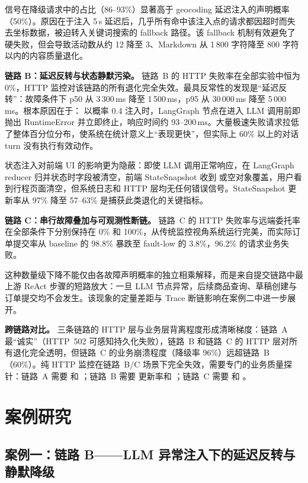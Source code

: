  信号在降级请求中的占比（86--93\%）显著高于 geocoding 延迟注入的声明概率（50\%）。原因在于注入 5\,s 延迟后，几乎所有命中该注入点的请求都因超时而失去坐标数据，被迫转入关键词搜索的 fallback 路径。该 fallback 机制有效避免了硬失败，但会导致活动数从约 12 降至 3、Markdown 从 1\,800 字符降至 800 字符以内的内容质量退化。

\noindent\textbf{链路 B：延迟反转与状态静默污染。}
链路~B 的 HTTP 失败率在全部实验中恒为 0\%，HTTP 监控对该链路的所有退化完全失效。最具反常性的发现是“延迟反转”：故障条件下 p50 从 3\,300\,ms 降至 1\,500\,ms，p95 从 30\,000\,ms 降至 5\,000\,ms。根本原因在于： 以概率 0.4 注入时，LangGraph 节点在进入 LLM 调用前即抛出 RuntimeError 并立即终止，响应时间约 93--200\,ms。大量极速失败请求拉低了整体百分位分布，使系统在统计意义上“表现更快”，但实际上 60\% 以上的对话 turn 没有执行有效动作。

状态注入对前端 UI 的影响更为隐蔽：即使 LLM 调用正常响应，在 LangGraph reducer 归并状态时字段被清空，前端 StateSnapshot 收到  或空对象覆盖，用户看到行程页面清空，但系统日志和 HTTP 层均无任何错误信号。StateSnapshot 更新率从 97\% 降至 57--63\% 是捕获此类退化的关键指标。

\noindent\textbf{链路 C：串行故障叠加与可观测性断链。}
链路~C 的 HTTP 失败率与远端委托率在全部条件下分别保持在 0\% 和 100\%，从传统监控视角系统运行完美，而实际订单提交率从 baseline 的 98.8\% 暴跌至 fault-low 的 3.8\%，96.2\% 的请求业务失败。

这种数量级下降不能仅由各故障声明概率的独立相乘解释，而是来自提交链路中最上游 ReAct 步骤的短路放大：一旦  LLM 节点异常，后续商品查询、草稿创建与订单提交均不会发生。该现象的定量差距与 Trace 断链影响在案例二中进一步展开。

\noindent\textbf{跨链路对比。}
三条链路的 HTTP 层与业务层背离程度形成清晰梯度：链路~A 最“诚实”（HTTP~502 可感知持久化失败），链路~B 和链路~C 的 HTTP 层对所有退化完全透明，但链路~C 的业务崩溃程度（降级率 96\%）远超链路~B（60\%）。纯 HTTP 监控在链路~B/C 场景下完全失效，需要专门的业务质量探针：链路~A 需要  和 ；链路~B 需要  更新率和 ；链路~C 需要  和 。

\section{案例研究}

\subsection{案例一：链路 B——LLM 异常注入下的延迟反转与静默降级}

